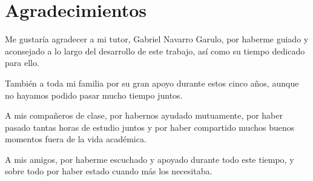 \newpage
\null
\thispagestyle{empty}

\chapter*{Agradecimientos}
\thispagestyle{empty}

Me gustaría agradecer a mi tutor, Gabriel Navarro Garulo, por haberme guiado y aconsejado a lo largo del desarrollo de este trabajo, así como su tiempo dedicado para ello.

También a toda mi familia por su gran apoyo durante estos cinco años, aunque no hayamos podido pasar mucho tiempo juntos.

A mis compañeros de clase, por habernos ayudado mutuamente, por haber pasado tantas horas de estudio juntos y por haber compartido muchos buenos momentos fuera de la vida académica.

A mis amigos, por haberme escuchado y apoyado durante todo este tiempo, y sobre todo por haber estado cuando más los necesitaba. 


\newpage